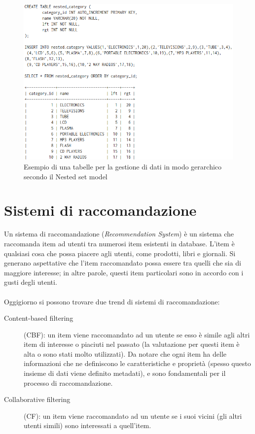 \begin{figure}[ht!]
    \centering
	\includegraphics[scale=0.6]{images/Nested_Tree_Model_table.PNG}
	\caption{Esempio di una tabelle per la gestione di dati in modo gerarchico secondo il Nested set model}
\end{figure}

\newpage

\section{Sistemi di raccomandazione}
Un sistema di raccomandazione (\textit{Recommendation System}) è un sistema che raccomanda item ad utenti tra numerosi item esistenti 
in database. L'item è qualsiasi cosa che possa piacere agli utenti, come prodotti, libri e giornali. Si generano aspettative che 
l'item raccomandato possa essere tra quelli che sia di maggiore interesse; in altre parole, questi item particolari sono in accordo 
con i gusti degli utenti. 
\\
\\
Oggigiorno si possono trovare due trend di sistemi di raccomandazione: 
\begin{description}
	\item[Content-based filtering](CBF): un item viene raccomandato ad un utente se esso è simile agli altri item di interesse o piaciuti
	nel passato (la valutazione per questi item è alta o sono stati molto utilizzati). Da notare che ogni item ha delle informazioni che
	ne definiscono le caratteristiche e proprietà (spesso questo insieme di dati viene definito metadati), e sono fondamentali per il 
	processo di raccomandazione. 
	\item[Collaborative filtering](CF): un item viene raccomandato ad un utente se i suoi vicini (gli altri utenti simili) sono interessati
	a quell'item.   
\end{description}


